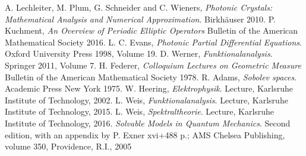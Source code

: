 \begin{thebibliography}{00}
   A. Lechleiter, M. Plum, G. Schneider and C. Wieners, {\it Photonic Crystals: Mathematical Analysis and Numerical Approximation}. Birkh{\"a}user 2010.
   P. Kuchment, {\it An Overview of Periodic Elliptic Operators} Bulletin of the American Mathematical Society 2016.
   L. C. Evans, {\it Photonic Partial Differential Equations}. Oxford University Press 1998, Volume 19.
   D. Werner, {\it Funktionalanalysis}. Springer 2011, Volume 7.
   H. Federer, {\it Colloquium Lectures on Geometric Measure} Bulletin of the American Mathematical Society 1978.
   R. Adams, {\it Sobolev spaces}. Academic Press New York 1975.
   W. Heering, {\it Elektrophysik}. Lecture, Karlsruhe Institute of Technology, 2002.
   L. Weis, {\it Funktionalanalysis}. Lecture, Karlsruhe Institute of Technology, 2015.
   L. Weis, {\it Spektraltheorie}. Lecture, Karlsruhe Institute of Technology, 2016.
   {\it Solvable Models in Quantum Mechanics}. Second edition, with an appendix by P. Exner xvi+488 p.; AMS Chelsea Publishing, volume 350, Providence, R.I., 2005
\end{thebibliography}